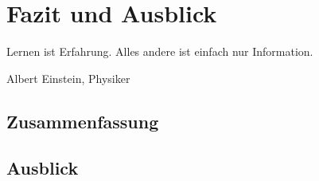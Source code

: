 \chapter{Fazit und Ausblick}
\label{cha:fazit}

\epigraph{Lernen ist Erfahrung. Alles andere ist einfach nur Information.}{Albert Einstein, Physiker}

\section{Zusammenfassung}
\label{sec:zusammenfassung}

\lipsum[4]

\section{Ausblick}
\label{sec:ausblick}

\lipsum[4]
